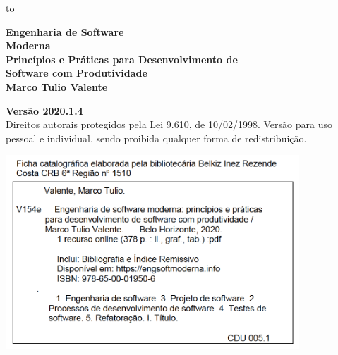 \documentclass[
  11pt,
  twoside]{book}
\author{}
\date{}
\begin{document}
\frontmatter

\thispagestyle{empty}

\begin{titlepage}

\vspace*{-38mm}
  \noindent\vbox to 
\end{titlepage}

\newpage
\thispagestyle{empty}
\vspace*{4cm}
\begin{center}
{\Huge \bf  Engenharia de Software\\[.3cm] Moderna}\\ 
\vspace*{1cm}
{\Large \bf  Princípios e Práticas para Desenvolvimento de\\[.3cm] Software com Produtividade}\\ 
\vspace*{3cm}
{\Large \bf Marco Tulio Valente}
\end{center}
\newpage

\newpage
\thispagestyle{empty}
\vspace*{3cm}
\begin{center}
{\Large \bf  Versão 2020.1.4}\\ 
\vspace*{1cm}
{\large Direitos autorais protegidos pela Lei 9.610, de 10/02/1998. Versão para  uso pessoal e individual, sendo proibida qualquer forma de redistribuição.}
\end{center}

\vspace*{3cm}
\begin{center}
\includegraphics[width=11cm]{figs/capa/ficha-catalografica.png}
\end{center}
\end{document}
